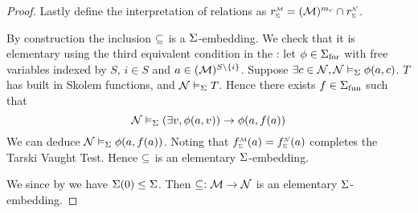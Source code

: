 \begin{proof}
    Lastly define the interpretation of relations as 
    $\subintp{\Si}{\MM}{r} = ({\MM})^{m_r} \cap \subintp{\Si}{\NN}{r}$.

    By construction the inclusion $\subseteq$ is a $\Sigma$-embedding. 
    We check that it is elementary using the third equivalent condition in the
    :
    let $\phi \in {\Sigma}_\mathrm{for}$ with free variables indexed by $S$,
    $i \in S$ and
    $a \in ({\mathcal{M}})^{S \setminus \left\{i\right\}}$.
    Suppose $\exists c \in {\mathcal{N}}, \mathcal{N} \vDash_{\Sigma} \phi(a,c)$.
    $T$ has built in Skolem functions,
    and $\mathcal{N} \vDash_{\Sigma} T$. 
    Hence there exists $f \in {\Sigma}_\mathrm{fun}$ such that
    \[
        \mathcal{N} \vDash_{\Sigma} (\exists v, \phi(a,v)) \to \phi(a,f(a)) 
    \]
    We can deduce $\mathcal{N} \vDash_{\Sigma} \phi(a,f(a))$.
    Noting that $\subintp{\Si}{\MM}{f}(a) = \subintp{\Si}{\NN}{f}(a)$ 
    completes the Tarski Vaught Test. 
    Hence $\subseteq$ is an elementary $\Sigma$-embedding.
    
    We  
    since by 
     we have 
    $\Sigma(0) \leq \Sigma$.
    Then $\subseteq : \mathcal{M} \to \mathcal{N}$ is an elementary $\Sigma$-embedding.
\end{proof}
